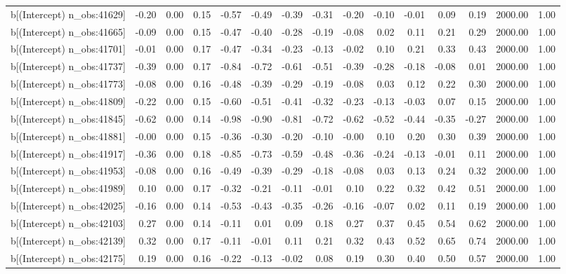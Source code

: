\begin{table}[ht]
\begin{tabular}{rrrrrrrrrrrrrrr}
  b[(Intercept) n\_obs:41629] & -0.20 & 0.00 & 0.15 & -0.57 & -0.49 & -0.39 & -0.31 & -0.20 & -0.10 & -0.01 & 0.09 & 0.19 & 2000.00 & 1.00 \\ 
  b[(Intercept) n\_obs:41665] & -0.09 & 0.00 & 0.15 & -0.47 & -0.40 & -0.28 & -0.19 & -0.08 & 0.02 & 0.11 & 0.21 & 0.29 & 2000.00 & 1.00 \\ 
  b[(Intercept) n\_obs:41701] & -0.01 & 0.00 & 0.17 & -0.47 & -0.34 & -0.23 & -0.13 & -0.02 & 0.10 & 0.21 & 0.33 & 0.43 & 2000.00 & 1.00 \\ 
  b[(Intercept) n\_obs:41737] & -0.39 & 0.00 & 0.17 & -0.84 & -0.72 & -0.61 & -0.51 & -0.39 & -0.28 & -0.18 & -0.08 & 0.01 & 2000.00 & 1.00 \\ 
  b[(Intercept) n\_obs:41773] & -0.08 & 0.00 & 0.16 & -0.48 & -0.39 & -0.29 & -0.19 & -0.08 & 0.03 & 0.12 & 0.22 & 0.30 & 2000.00 & 1.00 \\ 
  b[(Intercept) n\_obs:41809] & -0.22 & 0.00 & 0.15 & -0.60 & -0.51 & -0.41 & -0.32 & -0.23 & -0.13 & -0.03 & 0.07 & 0.15 & 2000.00 & 1.00 \\ 
  b[(Intercept) n\_obs:41845] & -0.62 & 0.00 & 0.14 & -0.98 & -0.90 & -0.81 & -0.72 & -0.62 & -0.52 & -0.44 & -0.35 & -0.27 & 2000.00 & 1.00 \\ 
  b[(Intercept) n\_obs:41881] & -0.00 & 0.00 & 0.15 & -0.36 & -0.30 & -0.20 & -0.10 & -0.00 & 0.10 & 0.20 & 0.30 & 0.39 & 2000.00 & 1.00 \\ 
  b[(Intercept) n\_obs:41917] & -0.36 & 0.00 & 0.18 & -0.85 & -0.73 & -0.59 & -0.48 & -0.36 & -0.24 & -0.13 & -0.01 & 0.11 & 2000.00 & 1.00 \\ 
  b[(Intercept) n\_obs:41953] & -0.08 & 0.00 & 0.16 & -0.49 & -0.39 & -0.29 & -0.18 & -0.08 & 0.03 & 0.13 & 0.24 & 0.32 & 2000.00 & 1.00 \\ 
  b[(Intercept) n\_obs:41989] & 0.10 & 0.00 & 0.17 & -0.32 & -0.21 & -0.11 & -0.01 & 0.10 & 0.22 & 0.32 & 0.42 & 0.51 & 2000.00 & 1.00 \\ 
  b[(Intercept) n\_obs:42025] & -0.16 & 0.00 & 0.14 & -0.53 & -0.43 & -0.35 & -0.26 & -0.16 & -0.07 & 0.02 & 0.11 & 0.19 & 2000.00 & 1.00 \\ 
  b[(Intercept) n\_obs:42103] & 0.27 & 0.00 & 0.14 & -0.11 & 0.01 & 0.09 & 0.18 & 0.27 & 0.37 & 0.45 & 0.54 & 0.62 & 2000.00 & 1.00 \\ 
  b[(Intercept) n\_obs:42139] & 0.32 & 0.00 & 0.17 & -0.11 & -0.01 & 0.11 & 0.21 & 0.32 & 0.43 & 0.52 & 0.65 & 0.74 & 2000.00 & 1.00 \\ 
  b[(Intercept) n\_obs:42175] & 0.19 & 0.00 & 0.16 & -0.22 & -0.13 & -0.02 & 0.08 & 0.19 & 0.30 & 0.40 & 0.50 & 0.57 & 2000.00 & 1.00 \\ 

\end{tabular}
\end{table}
